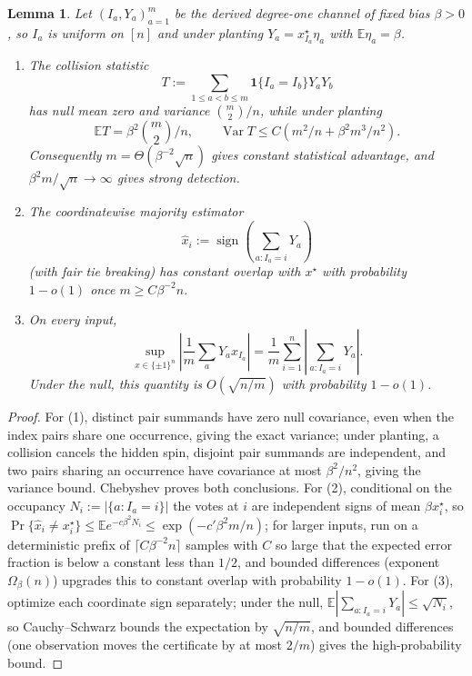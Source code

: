\documentclass[11pt]{article}
\newtheorem{lemma}[lemma]{Lemma}
\theoremstyle{definition}
\theoremstyle{remark}
\newcommand{\E}{\mathbb E}
\newcommand{\1}{\mathbf 1}
\DeclareMathOperator{\sign}{sign}
\DeclareMathOperator{\Var}{Var}
\numberwithin{equation}{section}
\begin{document}
\begin{lemma}\label{lem:degree-one-channel}
Let $(I_a,Y_a)_{a=1}^m$ be the derived degree-one channel of fixed bias
$\beta>0$, so $I_a$ is uniform on $[n]$ and under planting
$Y_a=x_{I_a}^\star\eta_a$ with $\E\eta_a=\beta$.
\begin{enumerate}
\item The collision statistic
\[
 T:=\sum_{1\le a<b\le m}\1\{I_a=I_b\}Y_aY_b
\]
has null mean zero and variance $\binom m2/n$, while under planting
\[
 \E T=\beta^2\binom m2/n,
 \qquad
 \Var T\le C\left(m^2/n+\beta^2m^3/n^2\right).
\]
Consequently $m=\Theta(\beta^{-2}\sqrt n)$ gives constant statistical
advantage, and $\beta^2m/\sqrt n\to\infty$ gives strong detection.
\item The coordinatewise majority estimator
\[
 \widehat x_i:=\sign\!\left(\sum_{a:I_a=i}Y_a\right)
\]
(with fair tie breaking) has constant overlap with $x^\star$ with
probability $1-o(1)$ once $m\ge C\beta^{-2}n$.
\item On every input,
\[
 \sup_{x\in\{\pm1\}^n}
 \left|\frac1m\sum_aY_ax_{I_a}\right|
 =\frac1m\sum_{i=1}^n
 \left|\sum_{a:I_a=i}Y_a\right|.
\]
Under the null, this quantity is $O(\sqrt{n/m})$ with probability
$1-o(1)$.
\end{enumerate}
\end{lemma}
\begin{proof}
For (1), distinct pair summands have zero null covariance, even when
the index pairs share one occurrence, giving the exact variance; under
planting, a collision cancels the hidden spin, disjoint pair summands
are independent, and two pairs sharing an occurrence have covariance at
most $\beta^2/n^2$, giving the variance bound.  Chebyshev proves both
conclusions.  For (2), conditional on the occupancy
$N_i:=|\{a:I_a=i\}|$ the votes at $i$ are independent signs of mean
$\beta x_i^\star$, so
$\Pr\{\widehat x_i\ne x_i^\star\}\le\E e^{-c\beta^2N_i}
\le\exp(-c'\beta^2m/n)$; for larger inputs, run on a deterministic
prefix of $\lceil C\beta^{-2}n\rceil$ samples with $C$ so large that
the expected error fraction is below a constant less than $1/2$, and
bounded differences (exponent $\Omega_\beta(n)$) upgrades this to
constant overlap with probability $1-o(1)$.  For (3), optimize each
coordinate sign separately; under the null,
$\E|\sum_{a:I_a=i}Y_a|\le\sqrt{N_i}$, so Cauchy--Schwarz bounds the
expectation by $\sqrt{n/m}$, and bounded differences (one observation
moves the certificate by at most $2/m$) gives the high-probability
bound.
\end{proof}
\end{document}
